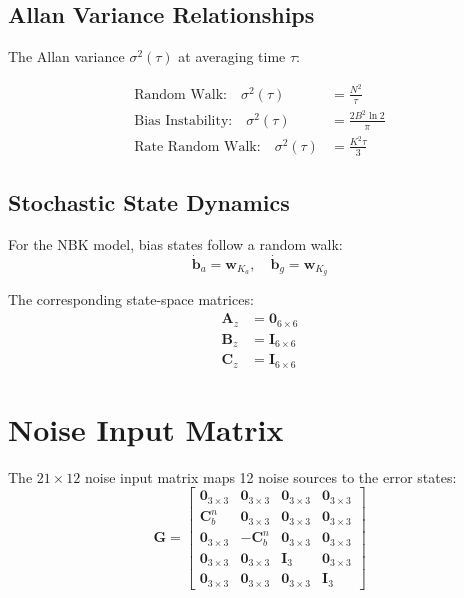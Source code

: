 \documentclass[11pt,a4paper]{article}
\newcommand{\mat}[1]{\mathbf{#1}}
\begin{document}
\subsection{Allan Variance Relationships}

The Allan variance $\sigma^2(\tau)$ at averaging time $\tau$:

\begin{align}
    \text{Random Walk:} \quad \sigma^2(\tau) &= \frac{N^2}{\tau} \\
    \text{Bias Instability:} \quad \sigma^2(\tau) &= \frac{2B^2 \ln 2}{\pi} \\
    \text{Rate Random Walk:} \quad \sigma^2(\tau) &= \frac{K^2 \tau}{3}
\end{align}

\subsection{Stochastic State Dynamics}

For the NBK model, bias states follow a random walk:
\begin{equation}
    \dot{\mat{b}}_a = \mat{w}_{K_a}, \quad \dot{\mat{b}}_g = \mat{w}_{K_g}
\end{equation}

The corresponding state-space matrices:
\begin{align}
    \mat{A}_z &= \mat{0}_{6\times6} \\
    \mat{B}_z &= \mat{I}_{6\times6} \\
    \mat{C}_z &= \mat{I}_{6\times6}
\end{align}

\section{Noise Input Matrix}

The $21 \times 12$ noise input matrix maps 12 noise sources to the error states:
\begin{equation}
    \mat{G} = \begin{bmatrix}
        \mat{0}_{3\times3} & \mat{0}_{3\times3} & \mat{0}_{3\times3} & \mat{0}_{3\times3} \\
        \mat{C}_b^n & \mat{0}_{3\times3} & \mat{0}_{3\times3} & \mat{0}_{3\times3} \\
        \mat{0}_{3\times3} & -\mat{C}_b^n & \mat{0}_{3\times3} & \mat{0}_{3\times3} \\
        \mat{0}_{3\times3} & \mat{0}_{3\times3} & \mat{I}_{3} & \mat{0}_{3\times3} \\
        \mat{0}_{3\times3} & \mat{0}_{3\times3} & \mat{0}_{3\times3} & \mat{I}_{3}
    \end{bmatrix}
\end{equation}
\end{document}
